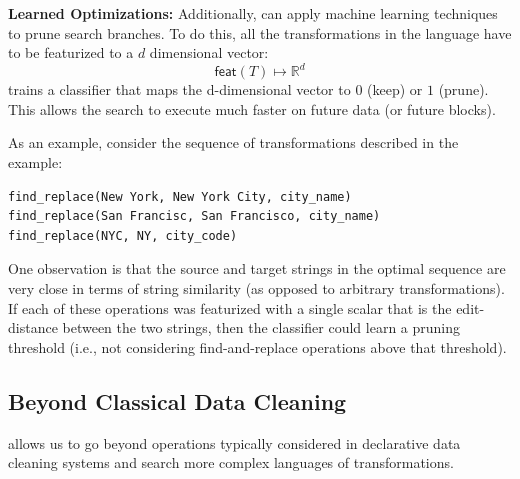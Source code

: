 \vspace{0.5em}\noindent\textbf{Learned Optimizations: } Additionally, \sys can apply machine learning techniques to prune search branches.
To do this, all the transformations in the language have to be featurized to a $d$ dimensional vector:
\[
\textsf{feat}(T) \mapsto \mathbb{R}^d
\]
\sys trains a classifier that maps the d-dimensional vector to $0$ (keep) or $1$ (prune).
This allows the search to execute much faster on future data (or future blocks).

As an example, consider the sequence of transformations described in the example:
\begin{lstlisting}
find_replace(New York, New York City, city_name)
find_replace(San Francisc, San Francisco, city_name)
find_replace(NYC, NY, city_code)
\end{lstlisting}
One observation is that the source and target strings in the optimal sequence are very close in terms of string similarity (as opposed to arbitrary transformations).
If each of these operations was featurized with a single scalar that is the edit-distance between the two strings, then the classifier could learn a pruning threshold (i.e., not considering find-and-replace operations above that threshold).


\subsection{Beyond Classical Data Cleaning}
\sys allows us to go beyond operations typically considered in declarative data cleaning systems and search more complex languages of transformations.

